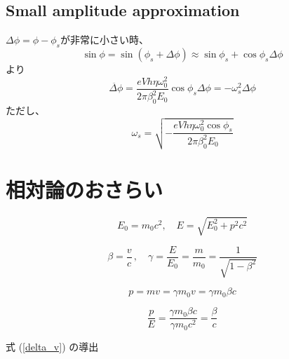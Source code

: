 \documentclass[10pt,a4paper]{ltjsarticle}
\begin{document}
\subsection{Small amplitude approximation}
$\Delta\phi = \phi - \phi_s$が非常に小さい時、
%
\begin{equation}
    \sin\phi = \sin(\phi_s+\Delta\phi) \approx \sin\phi_s + \cos\phi_s \Delta\phi
\end{equation}
%
より
%
\begin{equation}
    \ddot{\Delta\phi} = \frac{e V h \eta \omega_0^2}{2\pi \beta_0^2 E_0} \cos\phi_s \Delta\phi = - \omega_s^2 \Delta\phi
\end{equation}
%
ただし、
%
\begin{equation}
    \omega_s = \sqrt{-\frac{e V h \eta \omega_0^2 \cos\phi_s}{2\pi \beta_0^2 E_0}}
\end{equation}
%
\clearpage

\appendix
\renewcommand{\theequation}{\Alph{section}.\arabic{equation} }
\setcounter{equation}{0}

\section{相対論のおさらい}
\begin{equation}
    E_0 = m_0 c^2 ,\quad E = \sqrt{E_0^2 + p^2 c^2}
\end{equation}

\begin{equation}
    \beta = \frac{v}{c}\,,\quad \gamma = \frac{E}{E_0}=\frac{m}{m_0}=\frac{1}{\sqrt{1-\beta^2}}
\end{equation}

\begin{equation}
    p = mv = \gamma m_0 v = \gamma m_0 \beta c
\end{equation}

\begin{equation}
    \frac{p}{E} = \frac{\gamma m_0 \beta c}{\gamma m_0 c^2} = \frac{\beta}{c}
\end{equation}

式 (\ref{delta_v}) の導出
\end{document}
